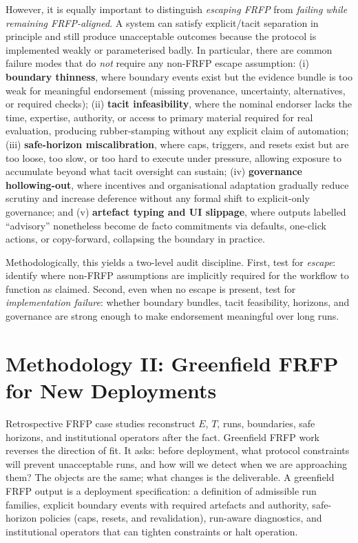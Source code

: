 However, it is equally important to distinguish \emph{escaping FRFP} from \emph{failing while remaining FRFP-aligned}. A system can satisfy explicit/tacit separation in principle and still produce unacceptable outcomes because the protocol is implemented weakly or parameterised badly. In particular, there are common failure modes that do \emph{not} require any non-FRFP escape assumption:
(i) \textbf{boundary thinness}, where boundary events exist but the evidence bundle is too weak for meaningful endorsement (missing provenance, uncertainty, alternatives, or required checks);
(ii) \textbf{tacit infeasibility}, where the nominal endorser lacks the time, expertise, authority, or access to primary material required for real evaluation, producing rubber-stamping without any explicit claim of automation;
(iii) \textbf{safe-horizon miscalibration}, where caps, triggers, and resets exist but are too loose, too slow, or too hard to execute under pressure, allowing exposure to accumulate beyond what tacit oversight can sustain;
(iv) \textbf{governance hollowing-out}, where incentives and organisational adaptation gradually reduce scrutiny and increase deference without any formal shift to explicit-only governance; and
(v) \textbf{artefact typing and UI slippage}, where outputs labelled ``advisory'' nonetheless become de facto commitments via defaults, one-click actions, or copy-forward, collapsing the boundary in practice.

Methodologically, this yields a two-level audit discipline. First, test for \emph{escape}: identify where non-FRFP assumptions are implicitly required for the workflow to function as claimed. Second, even when no escape is present, test for \emph{implementation failure}: whether boundary bundles, tacit feasibility, horizons, and governance are strong enough to make endorsement meaningful over long runs.

\section{Methodology II: Greenfield FRFP for New Deployments}
\label{sec:frfp-greenfield}

Retrospective FRFP case studies reconstruct \(E\), \(T\), runs, boundaries, safe horizons, and institutional operators after the fact. Greenfield FRFP work reverses the direction of fit. It asks: before deployment, what protocol constraints will prevent unacceptable runs, and how will we detect when we are approaching them? The objects are the same; what changes is the deliverable. A greenfield FRFP output is a deployment specification: a definition of admissible run families, explicit boundary events with required artefacts and authority, safe-horizon policies (caps, resets, and revalidation), run-aware diagnostics, and institutional operators that can tighten constraints or halt operation.

